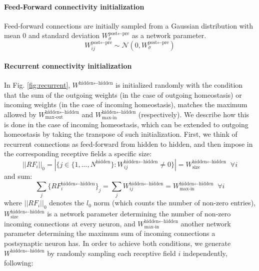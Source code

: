 \documentclass{article}
\begin{document}
\paragraph{Feed-Forward connectivity initialization}
Feed-forward connections are initially sampled from a Gaussian distribution with mean 0 and standard deviation $W^{\textrm{post}\leftarrow\textrm{pre}}_\sigma$ as a network parameter.
\begin{equation}
    W^{\textrm{post}\leftarrow\textrm{pre}}_{ij} \sim \mathcal{N}(0, W^{\textrm{post}\leftarrow\textrm{pre}}_\sigma)
\end{equation}
\paragraph{Recurrent connectivity initialization}
In Fig. \ref{fig:recurrent}, $W^{\textrm{hidden}\leftarrow\textrm{hidden}}$ is initialized randomly with the condition that the sum of the outgoing weights (in the case of outgoing homeostasis) or incoming weights (in the case of incoming homeostasis), matches the maximum allowed by $W^{\textrm{hidden}\leftarrow\textrm{hidden}}_\textrm{max-out}$ and $W^{\textrm{hidden}\leftarrow\textrm{hidden}}_\textrm{max-in}$ (respectively). We describe how this is done in the case of incoming homeostasis, which can be extended to outgoing homeostasis by taking the transpose of such initialization. First, we think of recurrent connections as feed-forward from hidden to hidden, and then impose in the corresponding receptive fields a specific size:
\begin{equation}
    || RF_i ||_0 = |\{j \in \{1, ..., N^\textrm{hidden}\} : W^{\textrm{hidden}\leftarrow\textrm{hidden}}_{ij} \neq 0\}| = W^{\textrm{hidden}\leftarrow\textrm{hidden}}_\textrm{size}\;\; \forall i
\end{equation}
and sum:
\begin{equation}
    \sum_j\{RF_i^{\textrm{hidden}\leftarrow\textrm{hidden}}\}_j = \sum_jW^{\textrm{hidden}\leftarrow\textrm{hidden}}_{ij} = W^{\textrm{hidden}\leftarrow\textrm{hidden}}_\textrm{max-in}\;\; \forall i
\end{equation}
where $|| RF_i ||_0$ denotes the $l_0$ norm (which counts the number of non-zero entries), $W^{\textrm{hidden}\leftarrow\textrm{hidden}}_\textrm{size}$ is a network parameter determining the number of non-zero incoming connections at every neuron, and $W^{\textrm{hidden}\leftarrow\textrm{hidden}}_\textrm{max-in}$ another network parameter determining the maximum sum of incoming connections a postsynaptic neuron has. In order to achieve both conditions, we generate $W^{\textrm{hidden}\leftarrow\textrm{hidden}}$ by randomly sampling each receptive field $i$ independently, following:
\end{document}
